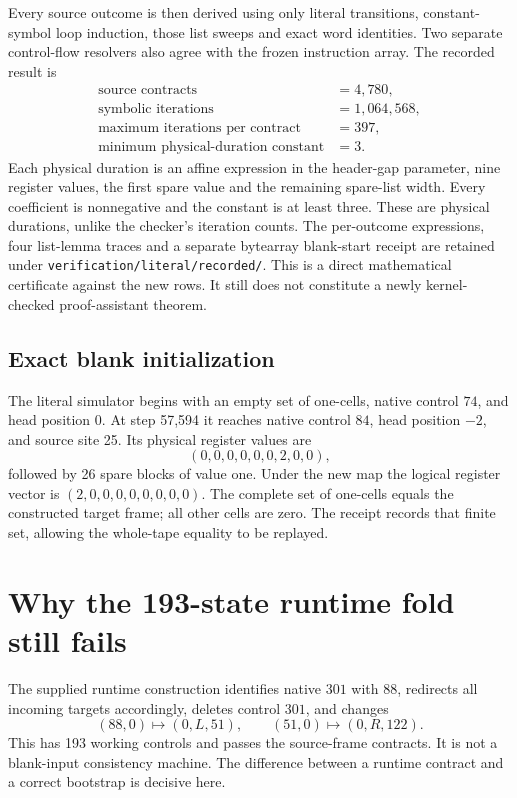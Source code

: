 \documentclass[11pt]{article}
\newcommand{\file}[1]{\nolinkurl{#1}}
\begin{document}
Every source outcome is then derived using only literal transitions,
constant-symbol loop induction, those list sweeps and exact word identities.
Two separate control-flow resolvers also agree with the frozen instruction
array. The recorded result is
\[
 \begin{aligned}
 \text{source contracts}&=4{,}780,\\
 \text{symbolic iterations}&=1{,}064{,}568,\\
 \text{maximum iterations per contract}&=397,\\
 \text{minimum physical-duration constant}&=3.
 \end{aligned}
\]
Each physical duration is an affine expression in the header-gap parameter,
nine register values, the first spare value and the remaining spare-list
width. Every coefficient is nonnegative and the constant is at least three.
These are physical durations, unlike the checker's iteration counts. The
per-outcome expressions, four list-lemma traces and a separate bytearray
blank-start receipt are retained under \file{verification/literal/recorded/}.
This is a direct mathematical certificate against the new rows. It still
does not constitute a newly kernel-checked proof-assistant theorem.

\subsection{Exact blank initialization}
The literal simulator begins with an empty set of one-cells, native control
$74$, and head position $0$. At step 57,594 it reaches native control $84$,
head position $-2$, and source site 25. Its physical register values are
\[
 (0,0,0,0,0,0,2,0,0),
\]
followed by 26 spare blocks of value one. Under the new map the logical
register vector is $(2,0,0,0,0,0,0,0,0)$. The complete set of one-cells equals
the constructed target frame; all other cells are zero. The receipt records
that finite set, allowing the whole-tape equality to be replayed.

\section{Why the 193-state runtime fold still fails}
\label{sec:obstruction}

The supplied runtime construction identifies native $301$ with $88$, redirects
all incoming targets accordingly, deletes control $301$, and changes
\[
 (88,0)\mapsto(0,L,51),\qquad
 (51,0)\mapsto(0,R,122).
\]
This has 193 working controls and passes the source-frame contracts. It is
not a blank-input consistency machine. The difference between a runtime
contract and a correct bootstrap is decisive here.
\end{document}
